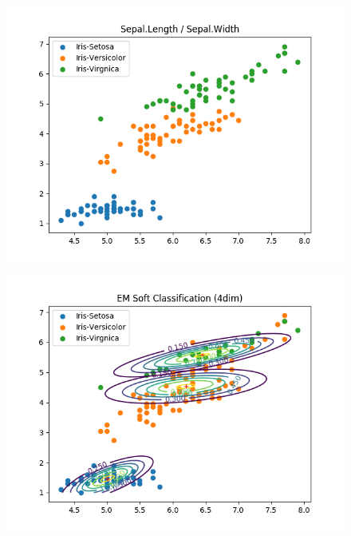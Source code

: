 \documentclass[a4paper]{article}
\begin{document}
\begin{figure}[htp]
\centering
\begin{minipage}{0.4\textwidth}
  \includegraphics[scale=0.5]{plots/basic_scenario2_cmpnt3.png}
  \label{fig:16}
\end{minipage}
\hfill
\begin{minipage}{0.4\textwidth}
  \includegraphics[scale=0.5]{plots/soft_classification_scenario2_cmpnt3.png}
  \label{fig:17}
\end{minipage}
\end{figure} 
\end{document}
